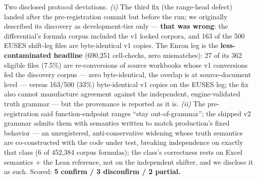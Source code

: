 \documentclass[
  11pt,
]{article}
\begin{document}
Two disclosed protocol deviations. \emph{(i)} The third fix (the
range-head defect) landed after the pre-registration commit but before
the run; we originally described its discovery as development-tier only
--- \textbf{that was wrong}: the differential's formula corpus included
the v1 locked corpora, and 163 of the 500 EUSES shift-leg files are
byte-identical v1 copies. The Enron leg is the \textbf{less-contaminated
headline} (690,251 cell-checks, zero mismatches): 27 of its 362 eligible
files (7.5\%) are re-conversions of source workbooks whose v1
conversions fed the discovery corpus --- zero byte-identical, the
overlap is at source-document level --- versus 163/500 (33\%)
byte-identical v1 copies on the EUSES leg; the fix also cannot
manufacture agreement against the independent, engine-validated truth
grammar --- but the provenance is reported as it is. \emph{(ii)} The
pre-registration said function-endpoint ranges ``stay out-of-grammar'';
the shipped v2 grammar admits them with semantics written to match
production's fixed behavior --- an unregistered, anti-conservative
widening whose truth semantics are co-constructed with the code under
test, breaking independence on exactly that class (6 of 452,384 corpus
formulas); the class's correctness rests on Excel semantics + the Lean
reference, not on the independent shifter, and we disclose it as such.
Scored: \textbf{5 confirm / 3 disconfirm / 2 partial.}
\end{document}
